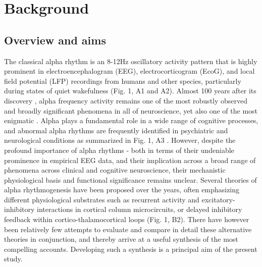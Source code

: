 \documentclass[12pt,twoside]{article}
\begin{document}
\newpage
\section{Background}
\subsection{Overview and aims}
The classical alpha rhythm is an 8-12Hz oscillatory activity pattern that is highly prominent in electroencephalogram (EEG), electrocorticogram (EcoG), and local field potential (LFP) recordings from humans and other species, particularly during states of quiet wakefulness (Fig. 1, A1 and A2). Almost 100 years after its discovery \citep{berger1929elektroenkephalogramm}, alpha frequency activity remains one of the most robustly observed and broadly significant phenomena in all of neuroscience, yet also one of the most enigmatic \citep{bollimunta2011neuronal}. Alpha plays a fundamental role in a wide range of cognitive processes, and abnormal alpha rhythms are frequently identified in psychiatric and neurological conditions as summarized in Fig. 1, A3 \citep{bucci2004executive, clancy2017restless,deiber2020linking,jensen2010shaping}. However, despite the profound importance of alpha rhythms - both in terms of their undeniable prominence in empirical EEG data, and their implication across a broad range of phenomena across clinical and cognitive neuroscience, their mechanistic physiological basis and functional significance remains unclear. Several theories of alpha rhythmogenesis have been proposed over the years, often emphasizing different physiological substrates such as recurrent activity and excitatory-inhibitory interactions in cortical column microcircuits, or delayed inhibitory feedback within cortico-thalamocortical loops (Fig. 1, B2). There have however been relatively few attempts to evaluate and compare in detail these alternative theories in conjunction, and thereby arrive at a useful synthesis of the most compelling accounts. Developing such a synthesis is a principal aim of the present study. 
\end{document}
